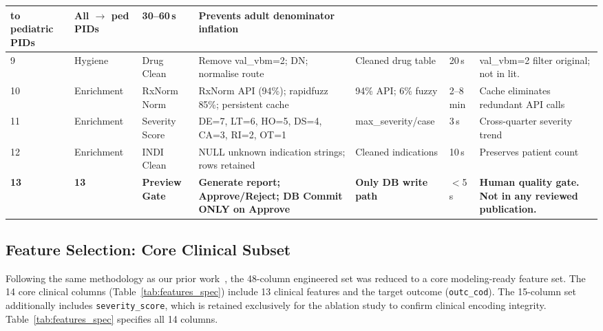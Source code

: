 \documentclass[10pt,twocolumn]{article}
\begin{document}
\begin{table}[!t]
\begin{tabular}{|>{\centering\arraybackslash}p{0.4cm}|>{\centering\arraybackslash}p{1.5cm}|p{1.7cm}|p{4.6cm}|p{2.3cm}|p{0.9cm}|p{3.6cm}|}
to pediatric PIDs&
All $\to$ ped PIDs&30--60\,s&
Prevents adult denominator inflation\\
\hline
\rowcolor{rowB}9&Hygiene&Drug Clean&Remove val\_vbm=2; DN; normalise route&
Cleaned drug table&20\,s&
val\_vbm=2 filter original; not in lit.\\
\hline
\rowcolor{rowA}10&Enrichment&RxNorm Norm&RxNorm API (94\%);
rapidfuzz 85\%; persistent cache&
94\% API; 6\% fuzzy&2--8\,min&
Cache eliminates redundant API calls\\
\hline
\rowcolor{rowB}11&Enrichment&Severity Score&DE=7, LT=6, HO=5,
DS=4, CA=3, RI=2, OT=1&
max\_severity/case&3\,s&
Cross-quarter severity trend\\
\hline
\rowcolor{rowA}12&Enrichment&INDI Clean&NULL unknown indication
strings; rows retained&
Cleaned indications&10\,s&
Preserves patient count\\
\hline
\rowcolor{rowB}\textbf{13}&\textbf{13}&\textbf{Preview Gate}&
\textbf{Generate report; Approve/Reject;
DB Commit ONLY on Approve}&
\textbf{Only DB write path}&$<$5\,s&
\textbf{Human quality gate. Not in any reviewed publication.}\\
\hline
\end{tabular}
\end{table}
 
\subsection{Feature Selection: Core Clinical Subset}
\label{sec:feature_subset}
 
Following the same methodology as our prior work~\cite{telkar2026obesity}, the 48-column engineered set was reduced to a core modeling-ready feature set. The 14 core clinical columns (Table~\ref{tab:features_spec}) include 13 clinical features and the target outcome (\texttt{outc\_cod}). The 15-column set additionally includes \texttt{severity\_score}, which is retained exclusively for the ablation study to confirm clinical encoding integrity. Table~\ref{tab:features_spec} specifies all 14 columns.
 
\end{document}
